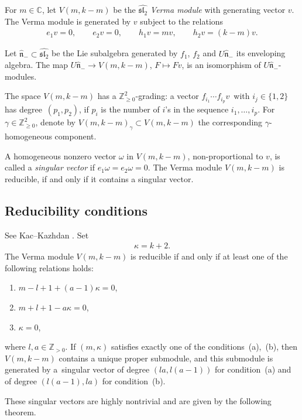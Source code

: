 For $m\in{\mathbb C}$, let $V(m,k-m)$ be the $\widehat{{\mathfrak{sl}_2}}$ {\em Verma module} with generating vector $v$. The Verma module is generated by $v$ subject to the relations
\begin{gather*}
e_1v=0,\qquad e_2v=0,\qquad h_1v=mv,\qquad h_2v=(k-m)v.
\end{gather*}

Let $\hat{\mathfrak{n}}_-\subset\widehat{{\mathfrak{sl}_2}}$ be the Lie subalgebra generated by $f_1$, $f_2$ and $U\hat{\mathfrak{n}}_-$ its enveloping algebra. The map $U\hat{\mathfrak{n}}_-\to V(m,k-m)$, $F\mapsto Fv$, is an isomorphism of $U\hat{\mathfrak{n}}_-$-modules.

The space $V(m,k-m)$ has a ${\mathbb Z}^2_{\geq 0}$-grading: a vector $f_{i_1}\cdots f_{i_p}v$\ with $i_j\in\{1,2\}$ has deg\-ree~$(p_1,p_2)$, if $p_i$ is the number of $i$'s in the sequence $i_1,\dots,i_p$. For $\gamma\in{\mathbb Z}^2_{\geq 0}$, denote by $V(m,k-m)_{\gamma}\subset V(m,k-m)$ the corresponding $\gamma$-homogeneous component.

A homogeneous nonzero vector $\omega$ in $V(m,k-m)$, non-proportional to $v$, is called a {\em singular vector} if $e_1\omega=e_2\omega=0$. The Verma module $V(m,k-m)$ is reducible, if and only if it contains a singular vector.

\subsection{Reducibility conditions}\label{reduc}
See Kac--Kazhdan \cite{KK}. Set
\begin{gather*}
\kappa=k+2.
\end{gather*}
The Verma module $V(m,k-m)$ is reducible if and only if at least one of the following relations holds:
\begin{enumerate}\itemsep=0pt
\item[(a)] $m-l+1+(a-1)\kappa=0$,
\item[(b)] $m+l+1-a\kappa=0$,
\item[(c)] $\kappa=0$,
\end{enumerate}
where $l,a\in{\mathbb Z}_{>0}$. If $(m,\kappa)$ satisfies exactly one of the conditions~(a),~(b), then $V(m,k-m)$ contains a unique proper submodule, and this submodule is generated by a~singular vector of degree $(la,l(a-1))$ for condition~(a) and of degree $(l(a-1),la)$ for condition~(b).

These singular vectors are highly nontrivial and are given by the following theorem.

